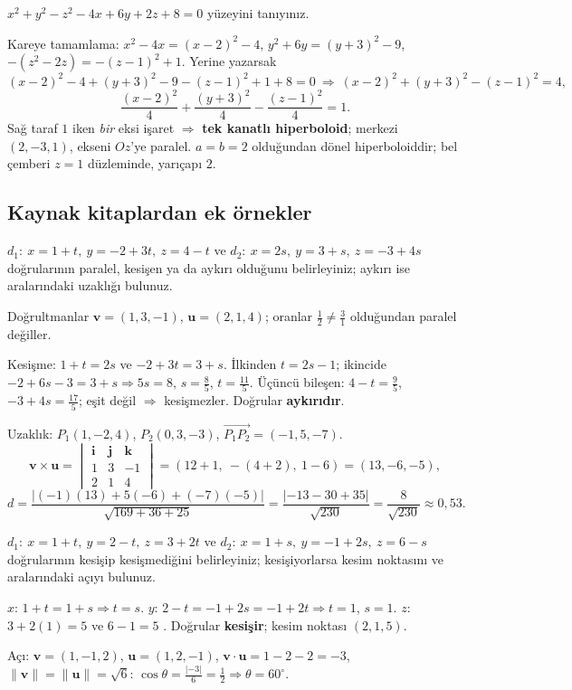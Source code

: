 \begin{soru}
$x^2+y^2-z^2-4x+6y+2z+8=0$ yüzeyini tanıyınız.
\end{soru}
\begin{cevap}
Kareye tamamlama: $x^2-4x=(x-2)^2-4$, $y^2+6y=(y+3)^2-9$, $-(z^2-2z)=-(z-1)^2+1$. Yerine yazarsak
\[ (x-2)^2-4+(y+3)^2-9-(z-1)^2+1+8=0\ \Longrightarrow\ (x-2)^2+(y+3)^2-(z-1)^2=4, \]
\[ \frac{(x-2)^2}{4}+\frac{(y+3)^2}{4}-\frac{(z-1)^2}{4}=1 . \]
Sağ taraf $1$ iken \emph{bir} eksi işaret $\Rightarrow$ \textbf{tek kanatlı hiperboloid}; merkezi $(2,-3,1)$, ekseni $Oz$'ye paralel. $a=b=2$ olduğundan dönel hiperboloiddir; bel çemberi $z=1$ düzleminde, yarıçapı $2$.
\end{cevap}

\subsection{Kaynak kitaplardan ek örnekler}

\begin{soru}
$d_1:\ x=1+t,\ y=-2+3t,\ z=4-t$ ve $d_2:\ x=2s,\ y=3+s,\ z=-3+4s$ doğrularının paralel, kesişen ya da aykırı olduğunu belirleyiniz; aykırı ise aralarındaki uzaklığı bulunuz.
\end{soru}
\begin{cevap}
Doğrultmanlar $\mathbf v=(1,3,-1)$, $\mathbf u=(2,1,4)$; oranlar $\frac12\neq\frac31$ olduğundan paralel değiller.

Kesişme: $1+t=2s$ ve $-2+3t=3+s$. İlkinden $t=2s-1$; ikincide $-2+6s-3=3+s\Rightarrow5s=8$, $s=\frac85$, $t=\frac{11}{5}$. Üçüncü bileşen: $4-t=\frac95$, $-3+4s=\frac{17}{5}$; eşit değil $\Rightarrow$ kesişmezler. Doğrular \textbf{aykırıdır}.

Uzaklık: $P_1(1,-2,4)$, $P_2(0,3,-3)$, $\overrightarrow{P_1P_2}=(-1,5,-7)$.
\[ \mathbf v\times\mathbf u=\begin{vmatrix}\mathbf i&\mathbf j&\mathbf k\\1&3&-1\\2&1&4\end{vmatrix}=(12+1,\ -(4+2),\ 1-6)=(13,-6,-5), \]
\[ d=\frac{|(-1)(13)+5(-6)+(-7)(-5)|}{\sqrt{169+36+25}}=\frac{|-13-30+35|}{\sqrt{230}}=\frac{8}{\sqrt{230}}\approx0{,}53 . \]
\end{cevap}

\begin{soru}
$d_1:\ x=1+t,\ y=2-t,\ z=3+2t$ ve $d_2:\ x=1+s,\ y=-1+2s,\ z=6-s$ doğrularının kesişip kesişmediğini belirleyiniz; kesişiyorlarsa kesim noktasını ve aralarındaki açıyı bulunuz.
\end{soru}
\begin{cevap}
$x$: $1+t=1+s\Rightarrow t=s$. $y$: $2-t=-1+2s=-1+2t\Rightarrow t=1$, $s=1$. $z$: $3+2(1)=5$ ve $6-1=5$ \checkmark. Doğrular \textbf{kesişir}; kesim noktası $(2,1,5)$.

Açı: $\mathbf v=(1,-1,2)$, $\mathbf u=(1,2,-1)$, $\mathbf v\cdot\mathbf u=1-2-2=-3$, $\|\mathbf v\|=\|\mathbf u\|=\sqrt6$:
$\cos\theta=\frac{|-3|}{6}=\frac12\Rightarrow\theta=60^\circ$.
\end{cevap}

